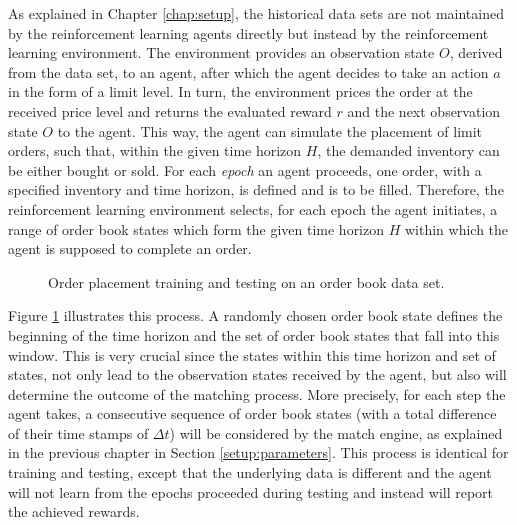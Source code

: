 As explained in Chapter \ref{chap:setup}, the historical data sets are not maintained by the reinforcement learning agents directly but instead by the reinforcement learning environment.
The environment provides an observation state $O$, derived from the data set, to an agent, after which the agent decides to take an action $a$ in the form of a limit level.
In turn, the environment prices the order at the received price level and returns the evaluated reward $r$ and the next observation state $O$ to the agent.
This way, the agent can simulate the placement of limit orders, such that, within the given time horizon $H$, the demanded inventory can be either bought or sold.
For each \textit{epoch} an agent proceeds, one order, with a specified inventory and time horizon, is defined and is to be filled.
Therefore, the reinforcement learning environment selects, for each epoch the agent initiates, a range of order book states which form the given time horizon $H$ within which the agent is supposed to complete an order.
\begin{figure}[H]
    \centering
    \caption{Order placement training and testing on an order book data set.}
    \label{fig:eval-orderbook-window}
\end{figure}
Figure \ref{fig:eval-orderbook-window} illustrates this process.
A randomly chosen order book state defines the beginning of the time horizon and the set of order book states that fall into this window.
This is very crucial since the states within this time horizon and set of states, not only lead to the observation states received by the agent, but also will determine the outcome of the matching process.
More precisely, for each step the agent takes, a consecutive sequence of order book states (with a total difference of their time stamps of $\Delta{t}$) will be considered by the match engine, as explained in the previous chapter in Section \ref{setup:parameters}.
This process is identical for training and testing, except that the underlying data is different and the agent will not learn from the epochs proceeded during testing and instead will report the achieved rewards.

